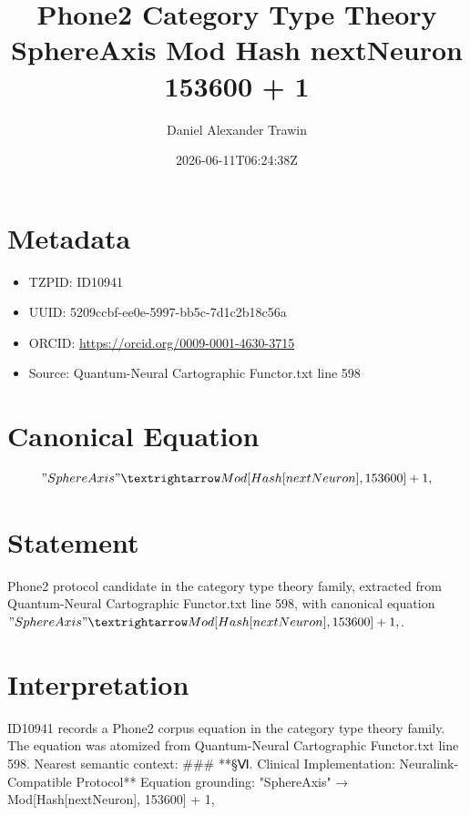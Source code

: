 \documentclass[11pt]{article}
\title{Phone2 Category Type Theory SphereAxis Mod Hash nextNeuron 153600 + 1}
\author{Daniel Alexander Trawin}
\date{2026-06-11T06:24:38Z}
\begin{document}
\maketitle
\section*{Metadata}
\begin{itemize}
\item TZPID: ID10941
\item UUID: 5209ccbf-ee0e-5997-bb5c-7d1c2b18c56a
\item ORCID: \url{https://orcid.org/0009-0001-4630-3715}
\item Source: Quantum-Neural Cartographic Functor.txt line 598
\end{itemize}
\section*{Canonical Equation}
\[
"SphereAxis" → Mod[Hash[nextNeuron], 153600] + 1,
\]
\section*{Statement}
Phone2 protocol candidate in the category type theory family, extracted from Quantum-Neural Cartographic Functor.txt line 598, with canonical equation $"SphereAxis" → Mod[Hash[nextNeuron], 153600] + 1,$.
\section*{Interpretation}
ID10941 records a Phone2 corpus equation in the category type theory family. The equation was atomized from Quantum-Neural Cartographic Functor.txt line 598. Nearest semantic context: ### **§Ⅵ. Clinical Implementation: Neuralink-Compatible Protocol** Equation grounding: "SphereAxis" → Mod[Hash[nextNeuron], 153600] + 1,
\end{document}
